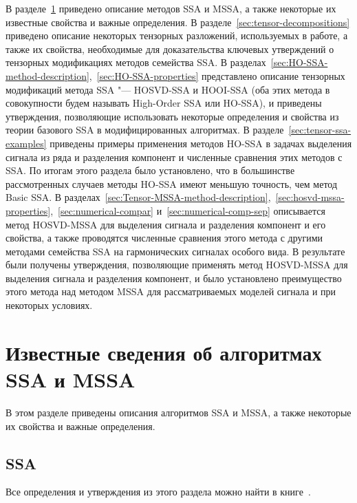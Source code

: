 \documentclass[specialist,
    substylefile = spbu.rtx,
    subf,href,colorlinks=true, 12pt]{disser}
\theoremstyle{plain}
\theoremstyle{definition}
\theoremstyle{remark}
\begin{document}
    В разделе~\ref{sec:known-results-ssa} приведено описание методов SSA и MSSA, а также некоторые их
    известные свойства и важные определения.
    В разделе~\ref{sec:tensor-decompositions} приведено описание некоторых тензорных разложений, используемых в работе,
    а также их свойства, необходимые для доказательства ключевых утверждений о
    тензорных модификациях методов семейства SSA.
    В разделах~\ref{sec:HO-SSA-method-description},~\ref{sec:HO-SSA-properties} представлено описание
    тензорных модификаций метода SSA "--- HOSVD-SSA и HOOI-SSA (оба этих метода в совокупности будем называть
    High-Order SSA или HO-SSA), и приведены утверждения, позволяющие использовать некоторые определения и
    свойства из теории базового SSA в модифицированных алгоритмах.
    В разделе~\ref{sec:tensor-ssa-examples} приведены примеры применения методов HO-SSA в задачах выделения сигнала
    из ряда и разделения компонент и численные сравнения этих методов с SSA.
    По итогам этого раздела
    было установлено,
    что в большинстве рассмотренных случаев методы HO-SSA имеют меньшую точность, чем метод Basic SSA.
    В разделах~\ref{sec:Tensor-MSSA-method-description},~\ref{sec:hosvd-mssa-properties},~\ref{sec:numerical-compar}
    и~\ref{sec:numerical-comp-sep}
    описывается метод HOSVD-MSSA для выделения сигнала и разделения компонент и его свойства, а также
    проводятся численные сравнения этого метода с другими методами семейства SSA на гармонических сигналах особого вида.
    В результате были получены утверждения, позволяющие применять метод HOSVD-MSSA для выделения сигнала и разделения компонент, и было установлено преимущество этого метода над методом MSSA для рассматриваемых моделей сигнала
    и при некоторых условиях.
    \newpage


    \section{Известные сведения об алгоритмах SSA и MSSA}\label{sec:known-results-ssa}
    В этом разделе приведены описания алгоритмов SSA и MSSA, а также некоторые их свойства и важные определения.


    \subsection{SSA}\label{subsec:ssa}
    Все определения и утверждения из этого раздела можно найти в книге~\cite{ssa}.
\end{document}
